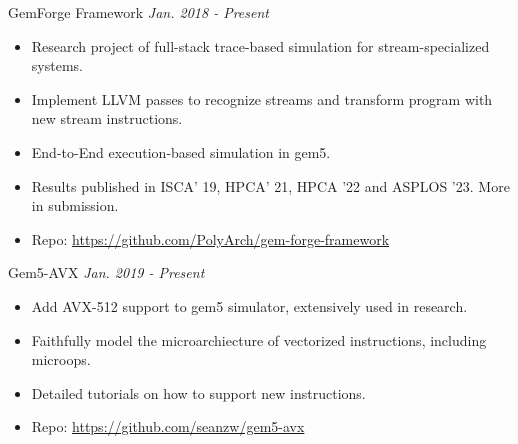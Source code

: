 \documentclass[a4paper]{article}
\newenvironment{changemargin}[2]{%
  \begin{list}{}{%
    \setlength{\topsep}{0pt}%
    \setlength{\leftmargin}{#1}%
    \setlength{\rightmargin}{#2}%
    \setlength{\listparindent}{\parindent}%
    \setlength{\itemindent}{\parindent}%
    \setlength{\parsep}{\parskip}%
  }%
  \item[]}{\end{list}
}
\newenvironment{body} {
	\vspace*{-16pt}
	\begin{changemargin}{-0.5in}{-0.5in}
  }	
	{\end{changemargin}
}
\begin{document}
\begin{body}
	\vspace{14pt}

	GemForge Framework \hfill \emph{Jan. 2018 - Present}
	\begin{itemize}
	\itemsep 0pt
	\item Research project of full-stack trace-based simulation for stream-specialized systems.
	\item Implement LLVM passes to recognize streams and transform program with new stream instructions.
	\item End-to-End execution-based simulation in gem5.
	\item Results published in ISCA' 19, HPCA' 21, HPCA '22 and ASPLOS '23. More in submission.
	\item Repo: \href{https://github.com/PolyArch/gem-forge-framework}{https://github.com/PolyArch/gem-forge-framework}
	\end{itemize}
	\smallskip

	Gem5-AVX \hfill \emph{Jan. 2019 - Present}
	\begin{itemize}
	\itemsep 0pt
	\item Add AVX-512 support to gem5 simulator, extensively used in research.
	\item Faithfully model the microarchiecture of vectorized instructions, including microops.
	\item Detailed tutorials on how to support new instructions.
	\item Repo: \href{https://github.com/seanzw/gem5-avx}{https://github.com/seanzw/gem5-avx}
	\end{itemize}
	\smallskip




\end{body}
\end{document}
